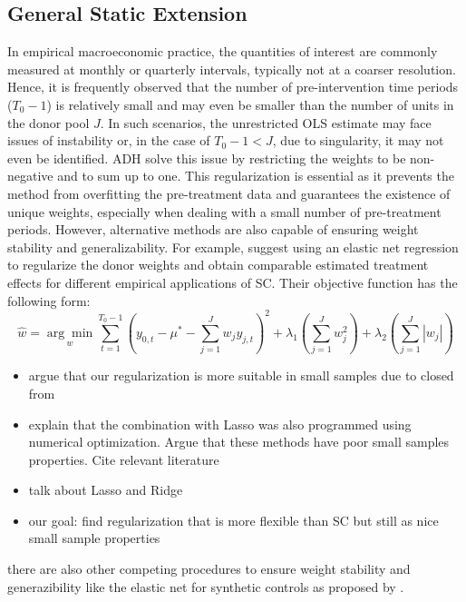\subsection{General Static Extension}
In empirical macroeconomic practice, the quantities of interest are commonly measured at monthly or quarterly intervals, typically not at a coarser resolution. Hence, it is frequently observed that the number of pre-intervention time periods ($T_0 - 1$) is relatively small and may even be smaller than the number of units in the donor pool $J$. In such scenarios, the unrestricted \ac{OLS} estimate may face issues of instability or, in the case of $T_0 - 1 < J$, due to singularity, it may not even be identified. \ac{ADH} solve this issue by restricting the weights to be non-negative and to sum up to one. This regularization is essential as it prevents the method from overfitting the pre-treatment data and guarantees the existence of unique weights, especially when dealing with a small number of pre-treatment periods. However, alternative methods are also capable of ensuring weight stability and generalizability. For example, \cite{doudchenko:2016} suggest using an elastic net regression to regularize the donor weights and obtain comparable estimated treatment effects for different empirical applications of \ac{SC}. Their objective function has the following form:
\[
\widehat{w} = 
\underset{w}{\arg\min}
\sum_{t=1}^{T_0-1}\left(y_{0,t} - \mu^* - \sum_{j = 1}^{J} w_j y_{j,t} \right)^2 + 
\lambda_1 \left( \sum_{j = 1}^{J} w_j^2 \right) + 
\lambda_2 \left( \sum_{j = 1}^{J} |w_j| \right)  
\]

\cite{tibshirani:1996}

\cite{hastie:2003}

\begin{itemize}
	\item argue that our regularization is more suitable in small samples due to closed from
	\item explain that the combination with Lasso was also programmed using numerical optimization. Argue that these methods have poor small samples properties. Cite relevant literature
	\item talk about Lasso and Ridge
	\item our goal: find regularization that is more flexible than SC but still as nice small sample properties
\end{itemize}

there are also other competing procedures to ensure weight stability and generazibility like the elastic net for synthetic controls as proposed by . 

